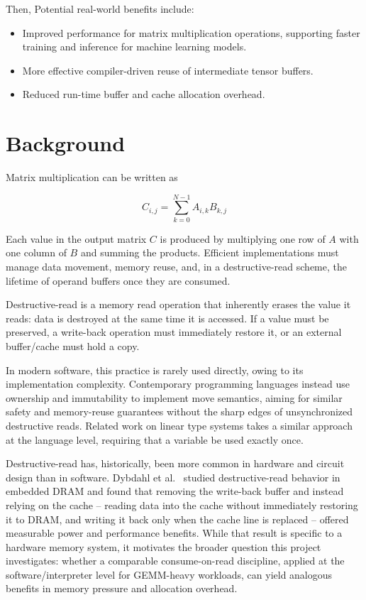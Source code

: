 \documentclass[a4paper]{article}
\begin{document}
Then, Potential real-world benefits include:

\begin{itemize}
	\item Improved performance for matrix multiplication operations, supporting faster training and inference for machine learning models.
	\item More effective compiler-driven reuse of intermediate tensor buffers.
	\item Reduced run-time buffer and cache allocation overhead.
\end{itemize}

\section{Background}


Matrix multiplication can be written as

\begin{equation}
C_{i,j} = \sum_{k=0}^{N-1} A_{i,k}B_{k,j}
\end{equation}

Each value in the output matrix $C$ is produced by multiplying one row of $A$ with one column of $B$ and summing the products. Efficient implementations must manage data movement, memory reuse, and, in a destructive-read scheme, the lifetime of operand buffers once they are consumed.

Destructive-read is a memory read operation that inherently erases the value it reads: data is destroyed at the same time it is accessed. If a value must be preserved, a write-back operation must immediately restore it, or an external buffer/cache must hold a copy.

In modern software, this practice is rarely used directly, owing to its implementation complexity. Contemporary programming languages instead use ownership and immutability to implement move semantics, aiming for similar safety and memory-reuse guarantees without the sharp edges of unsynchronized destructive reads. Related work on linear type systems takes a similar approach at the language level, requiring that a variable be used exactly once.

Destructive-read has, historically, been more common in hardware and circuit design than in software. Dybdahl et al.~\cite{DybdahlKGN06} studied destructive-read behavior in embedded DRAM and found that removing the write-back buffer and instead relying on the cache -- reading data into the cache without immediately restoring it to DRAM, and writing it back only when the cache line is replaced -- offered measurable power and performance benefits. While that result is specific to a hardware memory system, it motivates the broader question this project investigates: whether a comparable consume-on-read discipline, applied at the software/interpreter level for GEMM-heavy workloads, can yield analogous benefits in memory pressure and allocation overhead.
\end{document}
